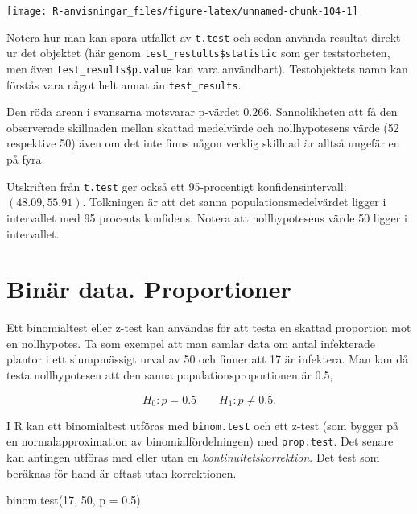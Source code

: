 \documentclass[
]{book}
\newenvironment{Shaded}{\begin{snugshade}}{\end{snugshade}}
\newcommand{\AttributeTok}[1]{\textcolor[rgb]{0.77,0.63,0.00}{#1}}
\newcommand{\DecValTok}[1]{\textcolor[rgb]{0.00,0.00,0.81}{#1}}
\newcommand{\FloatTok}[1]{\textcolor[rgb]{0.00,0.00,0.81}{#1}}
\newcommand{\FunctionTok}[1]{\textcolor[rgb]{0.00,0.00,0.00}{#1}}
\newcommand{\NormalTok}[1]{#1}
\theoremstyle{definition}
\theoremstyle{definition}
\theoremstyle{definition}
\theoremstyle{definition}
\theoremstyle{remark}
\begin{document}
\begin{center}\texttt{[image: R-anvisningar\_files/figure-latex/unnamed-chunk-104-1]} \end{center}

Notera hur man kan spara utfallet av \texttt{t.test} och sedan använda resultat direkt ur det objektet (här genom \texttt{test\_restults\$statistic} som ger teststorheten, men även \texttt{test\_results\$p.value} kan vara användbart). Testobjektets namn kan förstås vara något helt annat än \texttt{test\_results}.

Den röda arean i svansarna motsvarar p-värdet \(0.266\). Sannolikheten att få den observerade skillnaden mellan skattad medelvärde och nollhypotesens värde (52 respektive 50) även om det inte finns någon verklig skillnad är alltså ungefär en på fyra.

Utskriften från \texttt{t.test} ger också ett 95-procentigt konfidensintervall: \((48.09, 55.91)\). Tolkningen är att det sanna populationsmedelvärdet ligger i intervallet med 95 procents konfidens. Notera att nollhypotesens värde 50 ligger i intervallet.

\hypertarget{binuxe4r-data.-proportioner}{%
\section{Binär data. Proportioner}\label{binuxe4r-data.-proportioner}}

Ett binomialtest eller z-test kan användas för att testa en skattad proportion mot en nollhypotes. Ta som exempel att man samlar data om antal infekterade plantor i ett slumpmässigt urval av 50 och finner att 17 är infektera. Man kan då testa nollhypotesen att den sanna populationsproportionen är 0.5,

\[H_0: p = 0.5 \qquad H_1: p \neq 0.5.\]

I R kan ett binomialtest utföras med \texttt{binom.test} och ett z-test (som bygger på en normalapproximation av binomialfördelningen) med \texttt{prop.test}. Det senare kan antingen utföras med eller utan en \emph{kontinuitetskorrektion}. Det test som beräknas för hand är oftast utan korrektionen.

\begin{Shaded}
\begin{Highlighting}[]
\FunctionTok{binom.test}\NormalTok{(}\DecValTok{17}\NormalTok{, }\DecValTok{50}\NormalTok{, }\AttributeTok{p =} \FloatTok{0.5}\NormalTok{)}
\end{Highlighting}
\end{Shaded}
\end{document}

